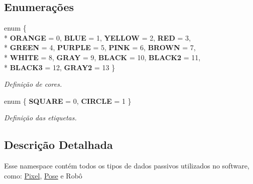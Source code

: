 \subsection*{Enumerações}
\begin{DoxyCompactItemize}
\item 
enum \{ \\*
{\bfseries O\+R\+A\+N\+GE} = 0, 
{\bfseries B\+L\+UE} = 1, 
{\bfseries Y\+E\+L\+L\+OW} = 2, 
{\bfseries R\+ED} = 3, 
\\*
{\bfseries G\+R\+E\+EN} = 4, 
{\bfseries P\+U\+R\+P\+LE} = 5, 
{\bfseries P\+I\+NK} = 6, 
{\bfseries B\+R\+O\+WN} = 7, 
\\*
{\bfseries W\+H\+I\+TE} = 8, 
{\bfseries G\+R\+AY} = 9, 
{\bfseries B\+L\+A\+CK} = 10, 
{\bfseries B\+L\+A\+C\+K2} = 11, 
\\*
{\bfseries B\+L\+A\+C\+K3} = 12, 
{\bfseries G\+R\+A\+Y2} = 13
 \}\hypertarget{namespacecommon_a491fb143df4d6e143a19de8d5863ef28}{}\label{namespacecommon_a491fb143df4d6e143a19de8d5863ef28}
\begin{DoxyCompactList}\small\item\em Definição de cores. \end{DoxyCompactList}
\item 
enum \{ {\bfseries S\+Q\+U\+A\+RE} = 0, 
{\bfseries C\+I\+R\+C\+LE} = 1
 \}\hypertarget{namespacecommon_a497fe38f750672b3984a9099aa7b7eed}{}\label{namespacecommon_a497fe38f750672b3984a9099aa7b7eed}
\begin{DoxyCompactList}\small\item\em Definição das etiquetas. \end{DoxyCompactList}
\end{DoxyCompactItemize}


\subsection{Descrição Detalhada}
Esse namespace contém todos os tipos de dados passivos utilizados no software, como\+: \hyperlink{structcommon_1_1Pixel}{Pixel}, \hyperlink{structcommon_1_1Pose}{Pose} e Robô 